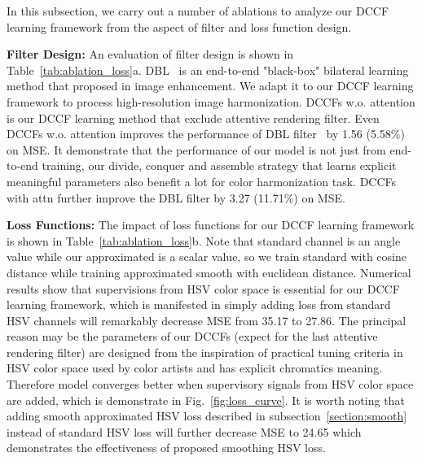\documentclass[runningheads]{llncs}
\begin{document}
    In this subsection, we carry out a number of ablations to analyze our DCCF learning framework from the aspect of filter and loss function design.
    
    \textbf{Filter Design:} An evaluation of filter design is shown in Table~\ref{tab:ablation_loss}a.
    DBL~\cite{gharbi2017deep} is an end-to-end "black-box" bilateral learning method that proposed in image enhancement.
    We adapt it to our DCCF learning framework to process high-resolution image harmonization.
    DCCFs w.o. attention is our DCCF learning method that exclude attentive rendering filter.
    Even DCCFs w.o. attention improves the performance of DBL filter~\cite{gharbi2017deep} by 1.56 (5.58\%) on MSE.
    It demonstrate that the performance of our model is not just from end-to-end training, 
    our divide, conquer and assemble strategy that learns explicit meaningful parameters also benefit a lot for color harmonization task.
    DCCFs with attn further improve the DBL filter\cite{gharbi2017deep} by 3.27 (11.71\%) on MSE.
    
    \textbf{Loss Functions:} The impact of loss functions for our DCCF learning framework is shown in Table~\ref{tab:ablation_loss}b.
Note that standard  channel is an angle value while our approximated  is a scalar value, so we train standard  with cosine distance while training approximated smooth  with euclidean distance.
    Numerical results show that supervisions from HSV color space is essential for our DCCF learning framework, which is manifested in simply adding loss from standard HSV channels will remarkably decrease MSE from 35.17 to 27.86.
The principal reason may be the parameters of our DCCFs (expect for the last attentive rendering filter) are designed from the inspiration of practical tuning criteria in HSV color space used by color artists and has explicit chromatics meaning.
    Therefore model converges better when supervisory signals from HSV color space are added, which is demonstrate in Fig.~\ref{fig:loss_curve}.
    It is worth noting that adding smooth approximated HSV loss described in subsection~\ref{section:smooth} instead of standard HSV loss will further decrease MSE to 24.65 which demonstrates the effectiveness of proposed smoothing HSV loss.
\end{document}
